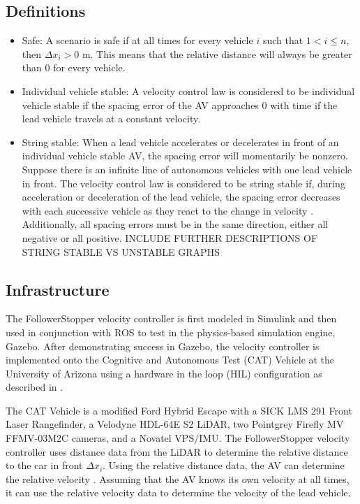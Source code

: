 \documentclass[conference]{IEEEtran}
\begin{document}
\subsection{Definitions}
\begin{itemize}
\item Safe: A scenario is safe if at all times for every vehicle $i$ such that $1<i\leq n$, then $\Delta x_i>0$ m. This means that the relative distance will always be greater than 0 for every vehicle.
\item Individual vehicle stable: A velocity control law is considered to be individual vehicle stable if the spacing error of the AV approaches 0 with time if the lead vehicle travels at a constant velocity.
\item String stable: When a lead vehicle accelerates or decelerates in front of an individual vehicle stable AV, the spacing error will momentarily be nonzero. Suppose there is an infinite line of autonomous vehicles with one lead vehicle in front. The velocity control law is considered to be string stable if, during acceleration or deceleration of the lead vehicle, the spacing error decreases with each successive vehicle as they react to the change in velocity \cite{Rajamani}. Additionally, all spacing errors must be in the same direction, either all negative or all positive. INCLUDE FURTHER DESCRIPTIONS OF STRING STABLE VS UNSTABLE GRAPHS
\end{itemize}

\subsection{Infrastructure}
The FollowerStopper velocity controller is first modeled in Simulink and then used in conjunction with ROS to test in the physics-based simulation engine, Gazebo. After demonstrating success in Gazebo, the velocity controller is implemented onto the Cognitive and Autonomous Test (CAT) Vehicle at the University of Arizona using a hardware in the loop (HIL) configuration as described in \cite{Bhadani}.

\hspace{0.01 in}The CAT Vehicle is a modified Ford Hybrid Escape with a SICK LMS 291 Front Laser Rangefinder, a Velodyne HDL-64E S2 LiDAR, two Pointgrey Firefly MV FFMV-03M2C cameras, and a Novatel VPS/IMU. The FollowerStopper velocity controller uses distance data from the LiDAR to determine the relative distance to the car in front $\Delta x_i$. Using the relative distance data, the AV can determine the relative velocity \cite{Real-time}. Assuming that the AV knows its own velocity at all times, it can use the relative velocity data to determine the velocity of the lead vehicle.
\end{document}
